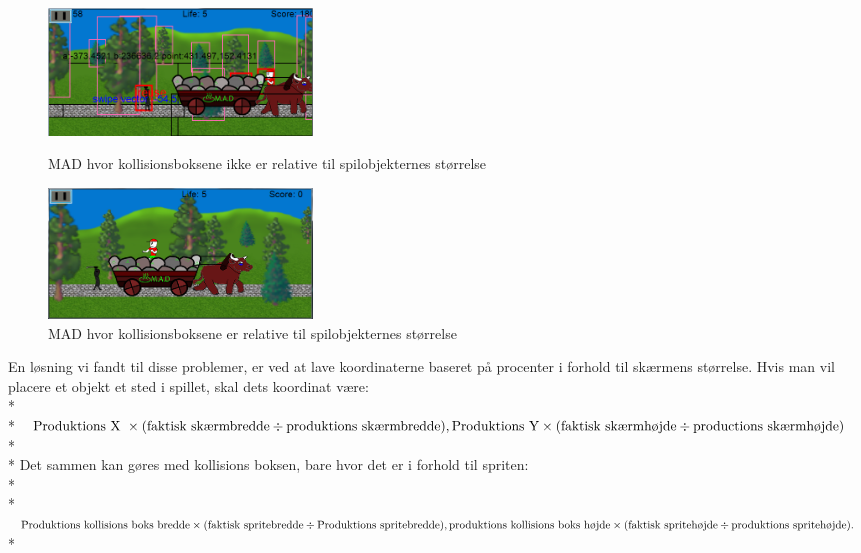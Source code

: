 \documentclass[Main.tex]{PositionOgSkalering}
\begin{document}
\begin{figure}[h]
\centering
\parbox{7cm}{   
\includegraphics[width = 7cm]{billeder/MADscaling5}
\caption{MAD hvor kollisionsboksene ikke er relative til spilobjekternes størrelse}    
\label{MADscaling5}}
\qquad
\begin{minipage}{7cm}
\includegraphics[width = 7cm]{billeder/MADscaling6}
\caption{MAD hvor kollisionsboksene er relative til spilobjekternes størrelse}    
\label{MADscaling6}
\end{minipage}
\end{figure}

En løsning vi fandt til disse problemer, er ved at lave koordinaterne baseret på procenter i forhold til skærmens størrelse. Hvis man vil placere et objekt et sted i spillet, skal dets koordinat være: \\*\\*
\begin{math}
\text{Produktions X } \times (\text{faktisk skærmbredde} \div \text{produktions skærmbredde}), \\*
\text{Produktions Y} \times (\text{faktisk skærmhøjde} \div \text{productions skærmhøjde})\end{math} \\* \\*
Det sammen kan gøres med kollisions boksen, bare hvor det er i forhold til spriten:\\*\\*
\begin{math}\text{Produktions kollisions boks bredde} \times (\text{faktisk spritebredde} \div \text{Produktions spritebredde}),\\*
\text{produktions kollisions boks højde} \times (\text{faktisk spritehøjde} \div \text{produktions spritehøjde}).  \end{math}\\*
\end{document}
